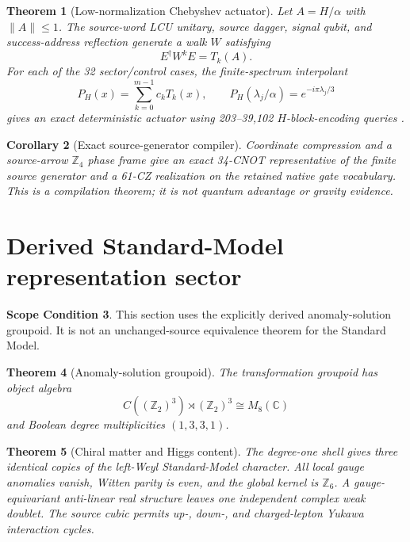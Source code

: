 \documentclass[11pt]{article}
\newtheorem{theorem}{Theorem}[section]
\newtheorem{corollary}[theorem]{Corollary}
\theoremstyle{definition}
\newtheorem{scope}[theorem]{Scope Condition}
\theoremstyle{remark}
\begin{document}
\begin{theorem}[Low-normalization Chebyshev actuator]
Let $A=H/\alpha$ with $\|A\|\le1$. The source-word LCU unitary, source dagger, signal qubit, and success-address reflection generate a walk $W$ satisfying
\begin{equation}
E^\dagger W^kE=T_k(A).
\label{eq:cheb}
\end{equation}
For each of the 32 sector/control cases, the finite-spectrum interpolant
\begin{equation}
P_H(x)=\sum_{k=0}^{m-1}c_kT_k(x),
\qquad
P_H(\lambda_j/\alpha)=e^{-i\pi\lambda_j/3}
\end{equation}
gives an exact deterministic actuator using 203--39,102 $H$-block-encoding queries \cite{childswiebe2012,lowchuang2017,gilyen2019}.
\end{theorem}

\begin{corollary}[Exact source-generator compiler]
Coordinate compression and a source-arrow $\mathbb Z_4$ phase frame give an exact 34-CNOT representative of the finite source generator and a 61-CZ realization on the retained native gate vocabulary. This is a compilation theorem; it is not quantum advantage or gravity evidence.
\end{corollary}

\section{Derived Standard-Model representation sector}

\begin{scope}
This section uses the explicitly derived anomaly-solution groupoid. It is not an unchanged-source equivalence theorem for the Standard Model.
\end{scope}

\begin{theorem}[Anomaly-solution groupoid]
The transformation groupoid has object algebra
\begin{equation}
C((\mathbb Z_2)^3)\rtimes(\mathbb Z_2)^3\cong M_8(\mathbb C)
\label{eq:m8}
\end{equation}
and Boolean degree multiplicities $(1,3,3,1)$.
\end{theorem}

\begin{theorem}[Chiral matter and Higgs content]
The degree-one shell gives three identical copies of the left-Weyl Standard-Model character. All local gauge anomalies vanish, Witten parity is even, and the global kernel is $\mathbb Z_6$. A gauge-equivariant anti-linear real structure leaves one independent complex weak doublet. The source cubic permits up-, down-, and charged-lepton Yukawa interaction cycles.
\end{theorem}
\end{document}
